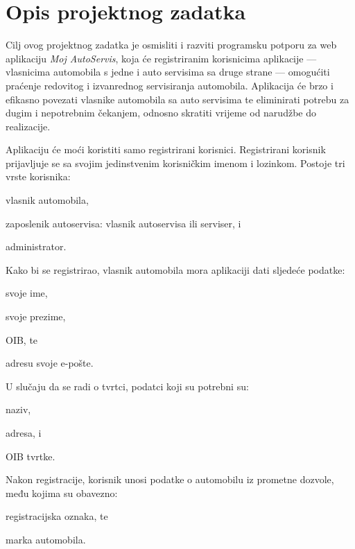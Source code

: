 \chapter{Opis projektnog zadatka}
		
		

		
		Cilj ovog projektnog zadatka je osmisliti i razviti programsku potporu  za web aplikaciju \textit{Moj AutoServis},  koja će registriranim korisnicima aplikacije --- vlasnicima automobila s jedne i auto servisima sa druge strane --- omogućiti praćenje redovitog i izvanrednog servisiranja automobila. Aplikacija će brzo i efikasno povezati  vlasnike automobila sa auto servisima te eliminirati potrebu za dugim i nepotrebnim čekanjem, odnosno skratiti vrijeme od narudžbe do realizacije. 
		
		
		
		
		Aplikaciju će moći koristiti samo registrirani korisnici. Registrirani korisnik prijavljuje se sa svojim jedinstvenim korisničkim imenom i lozinkom. Postoje tri vrste korisnika:
		\begin{packed_item}
			\item vlasnik automobila,
			\item zaposlenik autoservisa: vlasnik autoservisa ili serviser, i
			\item administrator.
		\end{packed_item}
		
		
		 Kako bi se registrirao, vlasnik automobila mora aplikaciji dati sljedeće podatke:
		\begin{packed_item}
			\item svoje ime,
			\item svoje prezime,
			\item OIB, te
			\item adresu svoje e-pošte.
		\end{packed_item}
		
		U slučaju da se radi o tvrtci, podatci koji su potrebni su:
		\begin{packed_item}
			\item naziv,
			\item adresa, i
			\item OIB tvrtke.
		\end{packed_item}
		
		Nakon registracije, korisnik unosi podatke o automobilu iz prometne dozvole, među kojima su obavezno:
		\begin{packed_item}
			\item registracijska oznaka, te
			\item marka automobila.
		\end{packed_item}
		
